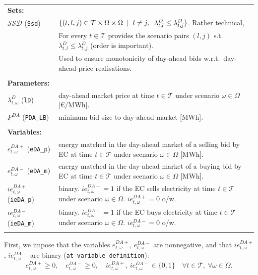 \documentclass{article}
\begin{document}
\begin{tabularx}{\textwidth}{l X}
    \textbf{Sets:} \\
    $\mathcal{SSD}$ (\verb|Ssd|) & $\{(t, l, j) \in \mathcal{T} \times \Omega \times \Omega
        \hspace{2mm} | \hspace{2mm} l \neq j, \hspace{2mm}
        \lambda^D_{t, l} \leq \lambda^D_{t, j} \}$. Rather technical, \\
    & For every $t \in \mathcal{T}$ provides the scenario pairs $(l, j)$
        s.t.\ $\lambda^D_{t, l} \leq \lambda^D_{t, j}$ (order is important). \\
    & Used to ensure monotonicity of day-ahead bids
        w.r.t.\ day-ahead price realisations. \\
    \\
    \textbf{Parameters:} \\
    $\lambda^{D}_{t, \omega}$ (\verb|lD|)
        & day-ahead market price at time $t \in \mathcal{T}$
          under scenario $\omega \in \Omega$ [\euro/MWh]. \\
    $\underline{P}^{DA}$ (\verb|PDA_LB|)
        & minimum bid size to day-ahead market [MWh]. \\
    \\
    \textbf{Variables:} \\
    $e^{DA+}_{t, \omega}$ (\verb|eDA_p|)
        & energy matched in the day-ahead market of a selling bid by EC
          at time $t \in \mathcal{T}$ under scenario $\omega \in \Omega$ [MWh]. \\
    $e^{DA-}_{t, \omega}$ (\verb|eDA_m|)
        & energy matched in the day-ahead market of a buying bid by EC
          at time $t \in \mathcal{T}$ under scenario $\omega \in \Omega$ [MWh]. \\
    $ie^{DA+}_{t, \omega}$ (\verb|ieDA_p|)
        & binary. $ie^{DA+}_{t, \omega} = 1$ if the EC sells electricity
          at time $t \in \mathcal{T}$ under scenario $\omega \in \Omega$.
          $ie^{DA+}_{t, \omega} = 0$ o/w. \\
    $ie^{DA-}_{t, \omega}$ (\verb|ieDA_m|)
        & binary. $ie^{DA-}_{t, \omega} = 1$ if the EC buys electricity
          at time $t \in \mathcal{T}$ under scenario $\omega \in \Omega$.
          $ie^{DA-}_{t, \omega} = 0$ o/w. \\
    \\
\end{tabularx}

First, we impose that the variables $e^{DA+}_{t, \omega}$, $e^{DA-}_{t, \omega}$ are
nonnegative, and that $ie^{DA+}_{t, \omega}$, $ie^{DA-}_{t, \omega}$ are binary
(\verb|at variable definition|):
\begin{equation} \label{EQ:DAVarDef}
    e^{DA+}_{t, \omega} \geq 0, \quad e^{DA-}_{t, \omega} \geq 0, \quad
    ie^{DA+}_{t, \omega},\ ie^{DA-}_{t, \omega} \in \{0, 1\}
    \quad \forall t \in \mathcal{T},\ \forall \omega \in \Omega.
\end{equation}
\end{document}
